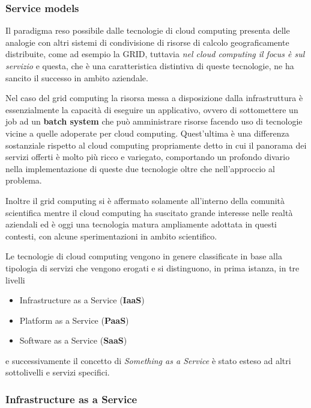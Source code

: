 \documentclass[italian,]{article}
\providecommand{\tightlist}{%
  \setlength{\itemsep}{0pt}\setlength{\parskip}{0pt}}
\begin{document}
\subsubsection{Service models}\label{service-models}

Il paradigma reso possibile dalle tecnologie di cloud computing presenta
delle analogie con altri sistemi di condivisione di risorse di calcolo
geograficamente distribuite, come ad esempio la GRID, tuttavia \emph{nel
cloud computing il focus è sul servizio} e questa, che è una
caratteristica distintiva di queste tecnologie, ne ha sancito il
successo in ambito aziendale.

Nel caso del grid computing la risorsa messa a disposizione dalla
infrastruttura è essenzialmente la capacità di eseguire un applicativo,
ovvero di sottomettere un job ad un \textbf{batch system} che può
amministrare risorse facendo uso di tecnologie vicine a quelle adoperate
per cloud computing. Quest'ultima è una differenza sostanziale rispetto
al cloud computing propriamente detto in cui il panorama dei servizi
offerti è molto più ricco e variegato, comportando un profondo divario
nella implementazione di queste due tecnologie oltre che nell'approccio
al problema.

Inoltre il grid computing si è affermato solamente all'interno della
comunità scientifica mentre il cloud computing ha suscitato grande
interesse nelle realtà aziendali ed è oggi una tecnologia matura
ampliamente adottata in questi contesti, con alcune sperimentazioni in
ambito scientifico.

Le tecnologie di cloud computing vengono in genere classificate in base
alla tipologia di servizi che vengono erogati e si distinguono, in prima
istanza, in tre livelli

\begin{itemize}
\tightlist
\item
  Infrastructure as a Service (\textbf{IaaS})
\item
  Platform as a Service (\textbf{PaaS})
\item
  Software as a Service (\textbf{SaaS})
\end{itemize}

e successivamente il concetto di \emph{Something as a Service} è stato
esteso ad altri sottolivelli e servizi specifici.

\subsubsection{Infrastructure as a
Service}\label{infrastructure-as-a-service}
\end{document}
